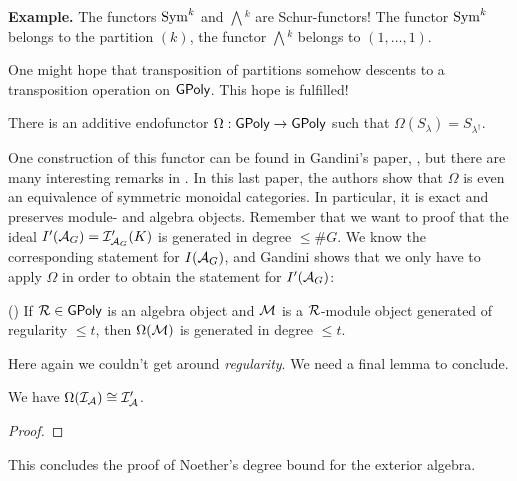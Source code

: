 \documentclass[../main.tex]{subfiles}
\begin{document}
\textbf{Example.} The functors $\operatorname{Sym}^k$ and $\bigwedge{}^k$ are Schur-functors! 
The functor $\operatorname{Sym}^k$ belongs to the partition $(k)$, the functor
$\bigwedge{}^k$ belongs to $(1,\dots, 1)$.

One might hope that transposition of partitions somehow descents to 
a transposition operation on $\textnormal{$\textsf{GPoly}$}$. This hope is fulfilled!
\begin{thm}[]
    There is an additive endofunctor $\Omega: \textnormal{$\textsf{GPoly}$} \to \textnormal{$\textsf{GPoly}$}$ such that 
    $\Omega(S_\lambda) = S_{\lambda^\dagger}$.
\end{thm}
One construction of this functor can be found in Gandini's paper,
\cite{Gandini2019ResOfIdeals}, but there are many interesting remarks in
\cite{sam2012introduction}. In this last paper, the authors show that $\Omega$
is even an equivalence of symmetric monoidal categories. In particular, 
it is exact and preserves module- and algebra objects. Remember that we want to
proof that the ideal $I'(\mathcal{A}_G) = \mathcal{I}'_{\mathcal{A}_G}(K)$ is generated in degree $\leq
\#G$. We know the corresponding statement for $I(\mathcal{A}_G)$, and Gandini shows
that we only have to apply $\Omega$ in order to obtain the statement for
$I'(\mathcal{A}_G)$:
\begin{prop}(\cite[Proposition 6.1]{Gandini2019ResOfIdeals})
    If $\mathcal{R} \in \textnormal{$\textsf{GPoly}$}$ is an algebra object and $\mathcal{M}$ is a $\mathcal{R}$-module object
    generated of regularity $\leq t$, then $\Omega(\mathcal{M})$ is generated in degree 
    $\leq t$. 
\end{prop}
Here again we couldn't get around \textit{regularity}. We need a final lemma to
conclude.
\begin{lem}
    We have $\Omega(\mathcal{I}_{\mathcal{A}}) \cong \mathcal{I}'_{\mathcal{A}}$.
\end{lem}
\begin{proof}
\end{proof}

This concludes the proof of Noether's degree bound for the exterior algebra.
\end{document}
